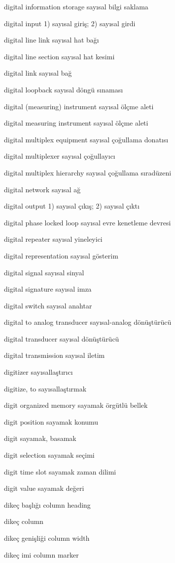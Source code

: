 \documentclass[12pt,fleqn]{article}\usepackage{../../common}
\begin{document}
digital information storage sayısal bilgi saklama

digital input 1) sayısal giriş; 2) sayısal girdi

digital line link sayısal hat bağı

digital line section sayısal hat kesimi

digital link sayısal bağ

digital loopback sayısal döngü sınaması

digital (measuring) instrument sayısal ölçme aleti

digital measuring instrument sayısal ölçme aleti

digital multiplex equipment sayısal çoğullama donatısı

digital multiplexer sayısal çoğullayıcı

digital multiplex hierarchy sayısal çoğullama sıradüzeni

digital network sayısal ağ

digital output 1) sayısal çıkış; 2) sayısal çıktı

digital phase locked loop sayısal evre kenetleme devresi

digital repeater sayısal yineleyici

digital representation sayısal gösterim

digital signal sayısal sinyal

digital signature sayısal imza

digital switch sayısal anahtar

digital to analog transducer sayısal-analog dönüştürücü

digital transducer sayısal dönüştürücü

digital transmission sayısal iletim

digitizer sayısallaştırıcı

digitize, to sayısallaştırmak

digit organized memory sayamak örgütlü bellek

digit position sayamak konumu

digit sayamak, basamak

digit selection sayamak seçimi

digit time slot sayamak zaman dilimi

digit value sayamak değeri

dikeç başlığı column heading

dikeç column

dikeç genişliği column width

dikeç imi column marker
\end{document}

